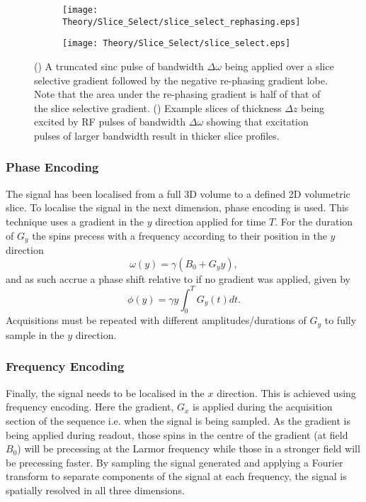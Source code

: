 \begin{figure}[H]
	\centering
	\begin{subfigure}[c]{0.47\textwidth}
		\centering
		\texttt{[image: Theory/Slice\_Select/slice\_select\_rephasing.eps]}
		\caption{}
		\label{fig:theory_slice_select_rephasing}
	\end{subfigure}
	\hfill
	\begin{subfigure}[c]{0.47\textwidth}
		\centering
		\texttt{[image: Theory/Slice\_Select/slice\_select.eps]}
		\caption{}
		\label{fig:theory_slice_select_profile}
	\end{subfigure}
	\caption{() A truncated sinc pulse of bandwidth $\Delta \omega$ being applied over a slice selective gradient followed by the negative re-phasing gradient lobe. Note that the area under the re-phasing gradient is half of that of the slice selective gradient. () Example slices of thickness $\Delta z$ being excited by \ac{RF} pulses of bandwidth $\Delta \omega$ showing that excitation pulses of larger bandwidth result in thicker slice profiles.}
	\label{fig:theory_slice_select}
\end{figure}
\subsubsection{Phase Encoding}
The signal has been localised from a full 3D volume to a defined 2D volumetric slice. To localise the signal in the next dimension, phase encoding is used. This technique uses a gradient in the $y$ direction applied for time $T$. For the duration of $G_y$ the spins precess with a frequency according to their position in the $y$ direction
\begin{equation}
\omega \left( y\right) = \gamma\left( B_0 + G_yy\right),
\end{equation}
and as such accrue a phase shift relative to if no gradient was applied, given by 
\begin{equation}
\phi\left( y\right)  = \gamma y \int_{0}^{T} G_y\left( t\right) dt.
\end{equation}
Acquisitions must be repeated with different amplitudes/durations of $G_y$ to fully sample in the $y$ direction.

\subsubsection{Frequency Encoding}
Finally, the signal needs to be localised in the $x$ direction. This is achieved using frequency encoding.
Here the gradient, $G_x$ is applied during the acquisition section of the sequence i.e. when the signal is being sampled. As the gradient is being applied during readout, those spins in the centre of the gradient (at field $B_0$) will be precessing at the Larmor frequency while those in a stronger field will be precessing faster. By sampling the signal generated and applying a Fourier transform to separate components of the signal at each frequency, the signal is spatially resolved in all three dimensions.\\

